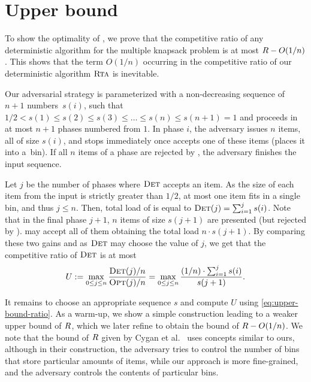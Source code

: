 


\section{Upper bound}
\label{sec:upper}

To show the optimality of \ALG, we prove that the competitive ratio of any
deterministic algorithm for the multiple knapsack problem is at most $R -
O(1/n)$. This shows that the term $O(1/n)$ occurring in the competitive
ratio of our deterministic algorithm $\textsc{Rta}$ is inevitable.

Our adversarial strategy is parameterized with a non-decreasing sequence of $n +
1$ numbers~$s(i)$, such that $1/2 < s(1) \leq s(2) \leq s(3) \leq \ldots \leq
s(n) \leq s(n+1) = 1$ and proceeds in at most $n+1$ phases numbered from $1$. In
phase $i$, the adversary issues $n$ items, all of size $s(i)$, and stops
immediately once \DET accepts one of these items (places it into a~bin). If all
$n$ items of a phase are rejected by \DET, the adversary finishes the input
sequence. 

Let $j$ be the number of phases where $\textsc{Det}$ accepts an item. As the size of
each item from the input is strictly greater than $1/2$, at most one item fits
in a single bin, and thus $j \leq n$. Then, total load of \DET is equal to
$\textsc{Det}(j) = \sum_{i = 1}^{j} s(i)$. Note that in the final phase $j+1$, $n$ items
of size $s(j+1)$ are presented (but rejected by \DET). \OPT may accept all of
them obtaining the total load $n \cdot s(j+1)$. By comparing these two gains and
as $\textsc{Det}$ may choose the value of $j$, we get that the competitive ratio of
$\textsc{Det}$ is at most
\begin{equation}
\label{eq:upper-bound-ratio}
U := \max_{0 \leq j \leq n} \frac{\textsc{Det}(j) / n}{\textsc{Opt}(j) / n} = 
  \max_{0 \leq j \leq n} \frac{ (1/n) \cdot \sum_{i = 1}^{j} s(i)}{s(j+1)}.
\end{equation}

It remains to choose an appropriate sequence $s$ and compute $U$ using \eqref{eq:upper-bound-ratio}. 
As a warm-up, we show a simple
construction leading to a weaker upper bound of $R$, which we later refine to
obtain the bound of $R - O(1/n)$. We note that the bound of $R$ given by Cygan
et al.~\cite{CyJeSg16} uses concepts similar to ours, although in their
construction, the adversary tries to control the number of bins that store
particular amounts of items, while our approach is more fine-grained, and the
adversary controls the contents of particular bins. 


